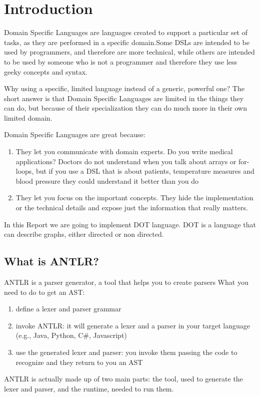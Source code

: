 \section{Introduction}
Domain Specific Languages are languages created to support
a particular set of tasks, as they are performed in a 
specific domain.Some DSLs are intended to be used by 
programmers, and therefore are more technical, while 
others are intended to be used by someone who is not 
a programmer and therefore they use less geeky concepts 
and syntax.

\par
Why using a specific, limited language instead of a 
generic, powerful one?
The short answer is that Domain Specific Languages 
are limited in the things they can do, but because 
of their specialization they can do much more in 
their own limited domain.
 
Domain Specific Languages are great because:
\begin{enumerate}
\item 
They let you communicate with domain experts. 
Do you write medical applications? Doctors do 
not understand when you talk about arrays or 
for-loops, but if you use a DSL that is about 
patients, temperature measures and blood pressure they could understand it better than you do
\item
They let you focus on the important concepts. 
They hide the implementation or the technical 
details and expose just the information that really matters.
\end{enumerate}

In this Report we are going to implement DOT language. 
DOT is a language that can describe graphs, either 
directed or non directed.

\subsection{What is ANTLR?}
ANTLR is a parser generator, a tool that helps you to 
create parsers
What you need to do to get an AST:
\begin{enumerate}
\item 
define a lexer and parser grammar
\item
invoke ANTLR: it will generate a lexer 
and a parser in your target language 
(e.g., Java, Python, C\#, Javascript)
\item
use the generated lexer and parser: you invoke 
them passing the code to recognize and they 
return to you an AST
\end{enumerate}
ANTLR is actually made up of two main parts: 
the tool, used to generate the lexer 
and parser, and the runtime, needed to run them.


